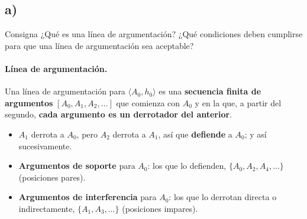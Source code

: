 \documentclass[11pt,a4paper]{article}
\begin{document}

\subsection{a)}

\begin{enunciado}{Consigna}
¿Qué es una línea de argumentación? ¿Qué condiciones deben cumplirse para que una línea de argumentación sea aceptable?
\end{enunciado}

\paragraph{Línea de argumentación.} Una línea de argumentación para $\langle A_0, h_0\rangle$ es una \textbf{secuencia finita de argumentos} $[A_0, A_1, A_2, \dots]$ que comienza con $A_0$ y en la que, a partir del segundo, \textbf{cada argumento es un derrotador del anterior}.
\begin{itemize}
  \item $A_1$ derrota a $A_0$, pero $A_2$ derrota a $A_1$, así que \textbf{defiende} a $A_0$; y así sucesivamente.
  \item \textbf{Argumentos de soporte} para $A_0$: los que lo defienden, $\{A_0, A_2, A_4, \dots\}$ (posiciones pares).
  \item \textbf{Argumentos de interferencia} para $A_0$: los que lo derrotan directa o indirectamente, $\{A_1, A_3, \dots\}$ (posiciones impares).
\end{itemize}

\begin{center}
\begin{minipage}{\linewidth}
\centering
{}
\end{minipage}
\end{center}
\end{document}

